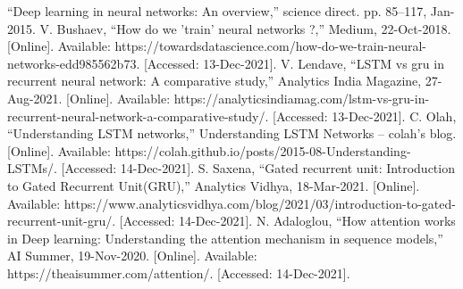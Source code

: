 \documentclass[conference]{IEEEtran}
\begin{document}
\begin{thebibliography}{00}
 “Deep learning in neural networks: An overview,” science direct. pp. 85–117, Jan-2015. 
 V. Bushaev, “How do we 'train' neural networks ?,” Medium, 22-Oct-2018. [Online]. Available: https://towardsdatascience.com/how-do-we-train-neural-networks-edd985562b73. [Accessed: 13-Dec-2021].
V. Lendave, “LSTM vs gru in recurrent neural network: A comparative study,” Analytics India Magazine, 27-Aug-2021. [Online]. Available: https://analyticsindiamag.com/lstm-vs-gru-in-recurrent-neural-network-a-comparative-study/. [Accessed: 13-Dec-2021]. 
C. Olah, “Understanding LSTM networks,” Understanding LSTM Networks -- colah's blog. [Online]. Available: https://colah.github.io/posts/2015-08-Understanding-LSTMs/. [Accessed: 14-Dec-2021]. 
S. Saxena, “Gated recurrent unit: Introduction to Gated Recurrent Unit(GRU),” Analytics Vidhya, 18-Mar-2021. [Online]. Available: https://www.analyticsvidhya.com/blog/2021/03/introduction-to-gated-recurrent-unit-gru/. [Accessed: 14-Dec-2021]. 
N. Adaloglou, “How attention works in Deep learning: Understanding the attention mechanism in sequence models,” AI Summer, 19-Nov-2020. [Online]. Available: https://theaisummer.com/attention/. [Accessed: 14-Dec-2021]. 
\end{thebibliography}
\end{document}
